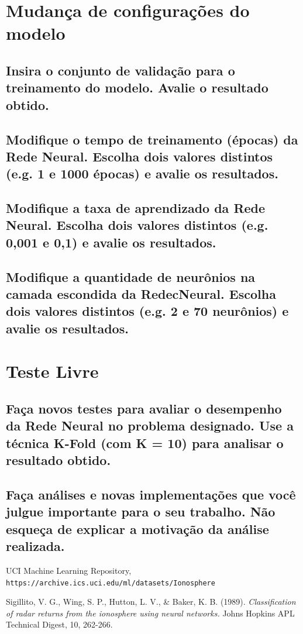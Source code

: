 \documentclass[12pt]{article}
\begin{document}
 
\section{Mudança de configurações do modelo}

\subsection{Insira o conjunto de validação para o treinamento do modelo. Avalie o resultado obtido.}

\subsection{Modifique o tempo de treinamento (épocas) da Rede Neural. Escolha dois valores distintos (e.g. 1 e 1000 épocas) e avalie os resultados.}

\subsection{Modifique a taxa de aprendizado da Rede Neural. Escolha dois valores distintos (e.g. 0,001 e 0,1) e avalie os resultados.}

\subsection{Modifique a quantidade de neurônios na camada escondida da RedecNeural. Escolha dois valores distintos (e.g. 2 e 70 neurônios) e avalie os	resultados.}


\section{Teste Livre}\label{sec:testelivre}

\subsection{Faça novos testes para avaliar o desempenho da Rede Neural no	problema designado. Use a técnica K-Fold (com K = 10) para analisar o	resultado obtido.}

\subsection{Faça análises e novas implementações que você julgue importante para o seu trabalho. Não esqueça de explicar a motivação da análise realizada.}



\begin{thebibliography}{99} 
	
	UCI Machine Learning Repository,\\ \texttt{https://archive.ics.uci.edu/ml/datasets/Ionosphere}
	
	 Sigillito, V. G., Wing, S. P., Hutton, L. V., \& Baker, K. B. (1989). \textit{Classification of radar returns from the ionosphere using neural networks.} Johns Hopkins APL Technical Digest, 10, 262-266.
	
	
	
	
	
	
\end{thebibliography}
\end{document}
